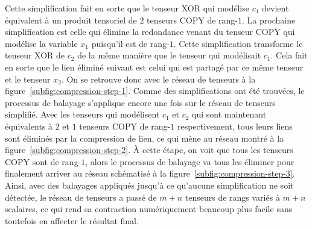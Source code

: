 Cette simplification fait en sorte que le tenseur XOR qui modélise $c_1$ devient équivalent à un produit tensoriel de $2$ tenseurs COPY de rang-$1$.
La prochaine simplification est celle qui élimine la redondance venant du tenseur COPY qui modélise la variable $x_1$ puisqu'il est de rang-$1$.
Cette simplification transforme le tenseur XOR de $c_2$ de la même manière que le tenseur qui modélisait $c_1$.
Cela fait en sorte que le lien éliminé suivant est celui qui est partagé par ce même tenseur et le tenseur $x_2$.
On se retrouve donc avec le réseau de tenseurs à la figure~\ref{subfig:compression-step-1}.
Comme des simplifications ont été trouvées, le processus de balayage s'applique encore une fois sur le réseau de tenseurs simplifié.
Avec les tenseurs qui modélisent $c_1$ et $c_2$ qui sont maintenant équivalents à $2$ et $1$ tenseurs COPY de rang-$1$ respectivement, tous leurs liens sont éliminés par la compression de lien, ce qui mène au réseau montré à la figure~\ref{subfig:compression-step-2}.
À cette étape, on voit que tous les tenseurs COPY sont de rang-$1$, alors le processus de balayage va tous les éliminer pour finalement arriver au réseau schématisé à la figure~\ref{subfig:compression-step-3}.
Ainsi, avec des balayages appliqués jusqu'à ce qu'aucune simplification ne soit détectée, le réseau de tenseurs a passé de $m + n$ tenseurs de rangs variés à $m + n$ scalaires, ce qui rend sa contraction numériquement beaucoup plus facile sans toutefois en affecter le résultat final.
